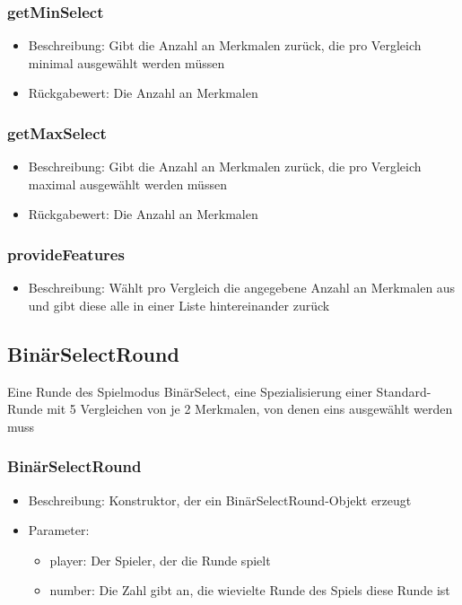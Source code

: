 \documentclass[a4paper]{scrreprt}
\begin{document}
	\subsubsection{getMinSelect}
	\begin{itemize}
		\item Beschreibung: Gibt die Anzahl an Merkmalen zurück, die pro Vergleich minimal ausgewählt werden müssen
		\item Rückgabewert: Die Anzahl an Merkmalen
	\end{itemize}
	\subsubsection{getMaxSelect}
	\begin{itemize}
		\item Beschreibung: Gibt die Anzahl an Merkmalen zurück, die pro Vergleich maximal ausgewählt werden müssen
		\item Rückgabewert: Die Anzahl an Merkmalen
	\end{itemize}
	\subsubsection{provideFeatures}
	\begin{itemize}
	\item Beschreibung: Wählt pro Vergleich die angegebene Anzahl an Merkmalen aus und gibt diese alle in einer Liste hintereinander zurück
	\end{itemize}

	\subsection{BinärSelectRound}
	Eine Runde des Spielmodus BinärSelect, eine Spezialisierung einer Standard-Runde mit 5 Vergleichen von je 2 Merkmalen, von denen eins ausgewählt werden muss
	\subsubsection{BinärSelectRound}
		\begin{itemize}
		\item Beschreibung: Konstruktor, der ein BinärSelectRound-Objekt erzeugt
		\item Parameter:
		\begin{itemize}
				\item player: Der Spieler, der die Runde spielt
				\item number: Die Zahl gibt an, die wievielte Runde des Spiels diese Runde ist
				\end{itemize}
		\end{itemize}
\end{document}
